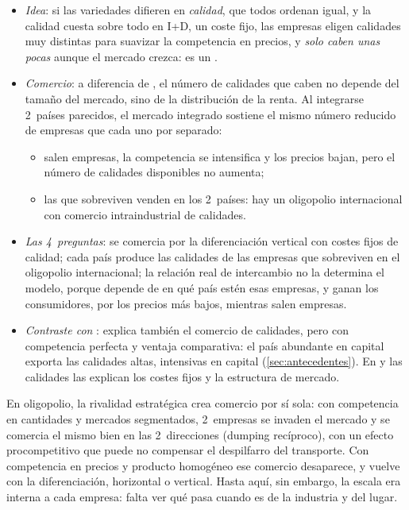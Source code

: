 \documentclass[11pt]{article}
\begin{document}
\begin{itemize}
\item \emph{Idea}: si las variedades difieren en \emph{calidad}, que todos ordenan igual, y la calidad cuesta sobre todo en I+D, un coste fijo, las empresas eligen calidades muy distintas para suavizar la competencia en precios, y \emph{solo caben unas pocas} aunque el mercado crezca: es un \nocite{ShakedSutton1983Natural} .
\item \emph{Comercio}\nocite{ShakedSutton1984Natural}: a diferencia de , el número de calidades que caben no depende del tamaño del mercado, sino de la distribución de la renta. Al integrarse 2~países parecidos, el mercado integrado sostiene el mismo número reducido de empresas que cada uno por separado:
  \begin{itemize}
  \item salen empresas, la competencia se intensifica y los precios bajan, pero el número de calidades disponibles no aumenta;
  \item las que sobreviven venden en los 2~países: hay un oligopolio internacional con comercio intraindustrial de calidades.
  \end{itemize}
\item \emph{Las 4~preguntas}: se comercia por la diferenciación vertical con costes fijos de calidad; cada país produce las calidades de las empresas que sobreviven en el oligopolio internacional; la relación real de intercambio no la determina el modelo, porque depende de en qué país estén esas empresas, y ganan los consumidores, por los precios más bajos, mientras salen empresas.
\item \emph{Contraste con }: \textcite{Falvey1981Commercial} explica también el comercio de calidades, pero con competencia perfecta y ventaja comparativa: el país abundante en capital exporta las calidades altas, intensivas en capital (\ref{sec:antecedentes}). En  y  las calidades las explican los costes fijos y la estructura de mercado.
\end{itemize}

\begin{ideaclave}
En oligopolio, la rivalidad estratégica crea comercio por sí sola: con competencia en cantidades y mercados segmentados, 2~empresas se invaden el mercado y se comercia el mismo bien en las 2~direcciones (dumping recíproco), con un efecto procompetitivo que puede no compensar el despilfarro del transporte. Con competencia en precios y producto homogéneo ese comercio desaparece, y vuelve con la diferenciación, horizontal o vertical. Hasta aquí, sin embargo, la escala era interna a cada empresa: falta ver qué pasa cuando es de la industria y del lugar.
\end{ideaclave}
\end{document}
